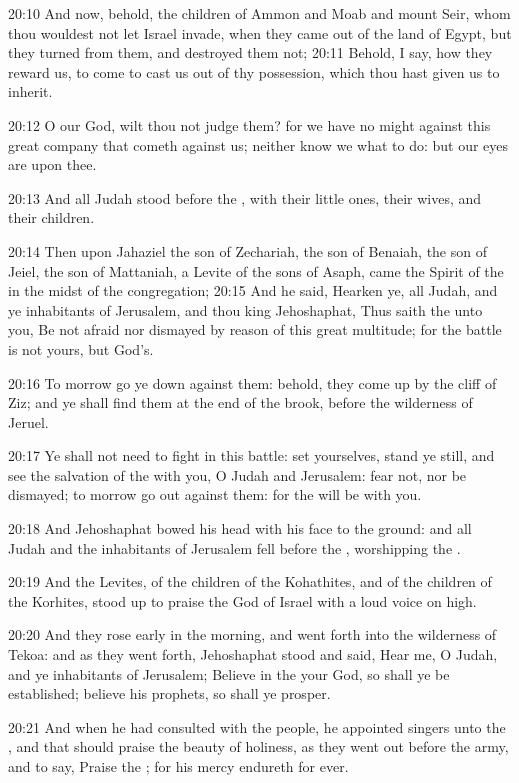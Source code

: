 20:10 And now, behold, the children of Ammon and Moab and mount Seir,
whom thou wouldest not let Israel invade, when they came out of the
land of Egypt, but they turned from them, and destroyed them not;
20:11 Behold, I say, how they reward us, to come to cast us out of thy
possession, which thou hast given us to inherit.

20:12 O our God, wilt thou not judge them? for we have no might
against this great company that cometh against us; neither know we
what to do: but our eyes are upon thee.

20:13 And all Judah stood before the \LORD, with their little ones,
their wives, and their children.

20:14 Then upon Jahaziel the son of Zechariah, the son of Benaiah, the
son of Jeiel, the son of Mattaniah, a Levite of the sons of Asaph,
came the Spirit of the \LORD in the midst of the congregation; 20:15
And he said, Hearken ye, all Judah, and ye inhabitants of Jerusalem,
and thou king Jehoshaphat, Thus saith the \LORD unto you, Be not afraid
nor dismayed by reason of this great multitude; for the battle is not
yours, but God's.

20:16 To morrow go ye down against them: behold, they come up by the
cliff of Ziz; and ye shall find them at the end of the brook, before
the wilderness of Jeruel.

20:17 Ye shall not need to fight in this battle: set yourselves, stand
ye still, and see the salvation of the \LORD with you, O Judah and
Jerusalem: fear not, nor be dismayed; to morrow go out against them:
for the \LORD will be with you.

20:18 And Jehoshaphat bowed his head with his face to the ground: and
all Judah and the inhabitants of Jerusalem fell before the \LORD,
worshipping the \LORD.

20:19 And the Levites, of the children of the Kohathites, and of the
children of the Korhites, stood up to praise the \LORD God of Israel
with a loud voice on high.

20:20 And they rose early in the morning, and went forth into the
wilderness of Tekoa: and as they went forth, Jehoshaphat stood and
said, Hear me, O Judah, and ye inhabitants of Jerusalem; Believe in
the \LORD your God, so shall ye be established; believe his prophets,
so shall ye prosper.

20:21 And when he had consulted with the people, he appointed singers
unto the \LORD, and that should praise the beauty of holiness, as they
went out before the army, and to say, Praise the \LORD; for his mercy
endureth for ever.

